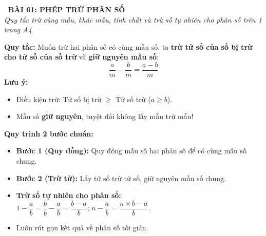 \documentclass[14pt,a4paper,oneside]{extbook}
\begin{document}
\noindent
\begin{tcolorbox}[
  enhanced,
  colback=teal!8!white,
  colframe=teal!80!black,
  arc=3mm, boxrule=1pt,
  left=3mm, right=3mm, top=2mm, bottom=2mm,
  halign=center
]
  {\Large\bfseries\color{teal!90!black}\faBookmark\ BÀI 61: PHÉP TRỪ PHÂN SỐ}\\[1.5pt]
  {\footnotesize\itshape\color{black!75} Quy tắc trừ cùng mẫu, khác mẫu, tính chất và trừ số tự nhiên cho phân số trên 1 trang A4}
\end{tcolorbox}

\vspace{-2.5mm}

\noindent
\begin{minipage}[t]{0.49\textwidth}\vspace{0pt}
\begin{tcolorbox}[
  enhanced,
  colback=blue!4!white,
  colframe=blue!75!black,
  arc=2mm, boxrule=0.8pt,
  left=2mm, right=2mm, top=1.8mm, bottom=1.8mm,
  title={\footnotesize\bfseries\color{white}\faMinusCircle\ 1. Trừ hai phân số cùng mẫu}
]
{\footnotesize
\textbf{Quy tắc:} Muốn trừ hai phân số có cùng mẫu số, ta \textbf{trừ tử số của số bị trừ cho tử số của số trừ} và \textbf{giữ nguyên mẫu số}:
$$\dfrac{a}{m} - \dfrac{b}{m} = \dfrac{a - b}{m}$$
\textbf{Lưu ý:}
\begin{itemize}\setlength{\itemsep}{1pt}\setlength{\leftskip}{-2.5mm}
  \item Điều kiện trừ: Tử số bị trừ $\ge$ Tử số trừ ($a \ge b$).
  \item Mẫu số \textbf{giữ nguyên}, tuyệt đối không lấy mẫu trừ mẫu!
\end{itemize}
}
\end{tcolorbox}
\end{minipage}
\hfill
\begin{minipage}[t]{0.49\textwidth}\vspace{0pt}
\begin{tcolorbox}[
  enhanced,
  colback=teal!4!white,
  colframe=teal!75!black,
  arc=2mm, boxrule=0.8pt,
  left=2mm, right=2mm, top=1.8mm, bottom=1.8mm,
  title={\footnotesize\bfseries\color{white}\faRandom\ 2. Trừ hai phân số khác mẫu}
]
{\footnotesize
\textbf{Quy trình 2 bước chuẩn:}
\begin{itemize}\setlength{\itemsep}{1.5pt}\setlength{\leftskip}{-2.5mm}
  \item \textbf{Bước 1 (Quy đồng):} Quy đồng mẫu số hai phân số để có cùng mẫu số chung.
  \item \textbf{Bước 2 (Trừ tử):} Lấy tử số trừ tử số, giữ nguyên mẫu số chung.
  \item \textbf{Trừ số tự nhiên cho phân số:}\\
  $1 - \dfrac{a}{b} = \dfrac{b}{b} - \dfrac{a}{b} = \dfrac{b - a}{b}$; \quad $n - \dfrac{a}{b} = \dfrac{n \times b - a}{b}$.
  \item Luôn rút gọn kết quả về phân số tối giản.
\end{itemize}
}
\end{tcolorbox}
\end{minipage}
\end{document}
